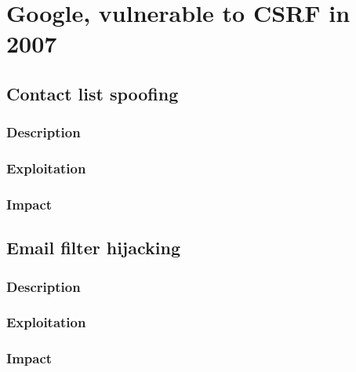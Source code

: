 \documentclass[a4paper,11pt]{report}
\begin{document}
%   
  

  \section{Google, vulnerable to CSRF in 2007}
  
  
  \subsection{Contact list spoofing}
  \subsubsection{Description}
  \subsubsection{Exploitation}
  \subsubsection{Impact}
  
  
  \subsection{Email filter hijacking}
  \subsubsection{Description}
  \subsubsection{Exploitation}
  \subsubsection{Impact}
  
\end{document}
